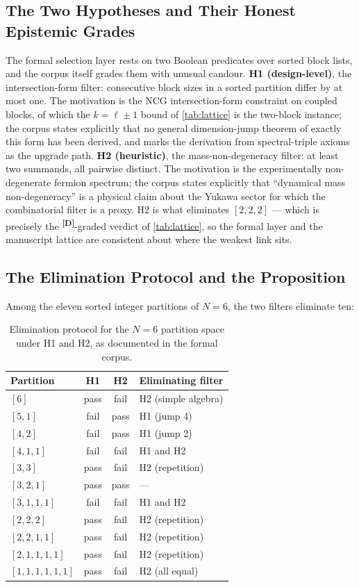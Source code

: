 \documentclass[12pt,a4paper,twoside]{article}
\theoremstyle{plain}
\theoremstyle{definition}
\theoremstyle{remark}
\newcommand{\catmark}[1]{\textsuperscript{\textsf{\textbf{[#1]}}}}
\begin{document}
\subsection{The Two Hypotheses and Their Honest Epistemic Grades}
\label{subsec:h1h2}

The formal selection layer rests on two Boolean predicates over sorted
block lists, and the corpus itself grades them with unusual candour.
\textbf{H1 (design-level)}, the intersection-form filter: consecutive
block sizes in a sorted partition differ by at most one. The motivation is
the NCG intersection-form constraint on coupled blocks, of which the
$k = \ell \pm 1$ bound of \cref{tab:lattice} is the two-block instance;
the corpus states explicitly that no general dimension-jump theorem of
exactly this form has been derived, and marks the derivation from
spectral-triple axioms as the upgrade path. \textbf{H2 (heuristic)}, the
mass-non-degeneracy filter: at least two summands, all pairwise distinct.
The motivation is the experimentally non-degenerate fermion spectrum; the
corpus states explicitly that ``dynamical mass non-degeneracy'' is a
physical claim about the Yukawa sector for which the combinatorial filter
is a proxy. H2 is what eliminates $[2,2,2]$ --- which is precisely the
\catmark{D}-graded verdict of \cref{tab:lattice}, so the formal layer and
the manuscript lattice are consistent about where the weakest link sits.

\newpage
\subsection{The Elimination Protocol and the Proposition}
\label{subsec:elimination}

Among the eleven sorted integer partitions of $N=6$, the two filters
eliminate ten:

\begin{table}[H]
\centering\small
\begin{tabular*}{\linewidth}{@{\extracolsep{\fill}}lccl@{}}
\toprule
Partition & H1 & H2 & Eliminating filter \\
\midrule
$[6]$ & pass & fail & H2 (simple algebra) \\
$[5,1]$ & fail & pass & H1 (jump 4) \\
$[4,2]$ & fail & pass & H1 (jump 2) \\
$[4,1,1]$ & fail & fail & H1 and H2 \\
$[3,3]$ & pass & fail & H2 (repetition) \\
$[3,2,1]$ & pass & pass & --- \\
$[3,1,1,1]$ & fail & fail & H1 and H2 \\
$[2,2,2]$ & pass & fail & H2 (repetition) \\
$[2,2,1,1]$ & pass & fail & H2 (repetition) \\
$[2,1,1,1,1]$ & pass & fail & H2 (repetition) \\
$[1,1,1,1,1,1]$ & pass & fail & H2 (all equal) \\
\bottomrule
\end{tabular*}
\caption{Elimination protocol for the $N=6$ partition space under
H1 and H2, as documented in the formal corpus.}
\label{tab:elimination}
\end{table}
\end{document}

